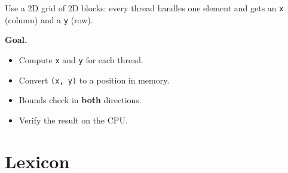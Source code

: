 \documentclass[main.tex]{subfiles}
\begin{document}
Use a 2D grid of 2D blocks: every thread handles one element and gets an \texttt{x} (column) and a \texttt{y} (row).

\textbf{Goal.}
\begin{itemize}[nosep]
  \item Compute \texttt{x} and \texttt{y} for each thread.
  \item Convert \texttt{(x, y)} to a position in memory.
  \item Bounds check in \textbf{both} directions.
  \item Verify the result on the CPU.
\end{itemize}

\section{Lexicon}
\end{document}
